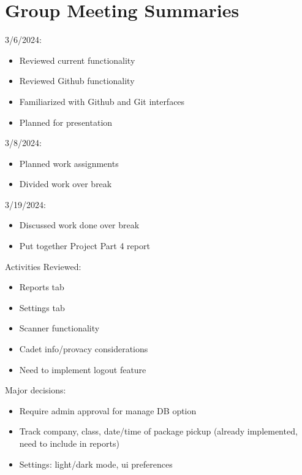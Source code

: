 \documentclass[11pt]{article}
\begin{document}
\section*{Group Meeting Summaries}
\label{sec:orge86276d}

3/6/2024:
\begin{itemize}
\item Reviewed current functionality
\item Reviewed Github functionality
\item Familiarized with Github and Git interfaces
\item Planned for presentation
\end{itemize}


3/8/2024:
\begin{itemize}
\item Planned work assignments
\item Divided work over break
\end{itemize}

3/19/2024:
\begin{itemize}
\item Discussed work done over break
\item Put together Project Part 4 report
\end{itemize}


Activities Reviewed:
\begin{itemize}
\item Reports tab
\item Settings tab
\item Scanner functionality
\item Cadet info/provacy considerations
\item Need to implement logout feature
\end{itemize}

Major decisions:
\begin{itemize}
\item Require admin approval for manage DB option
\item Track company, class, date/time of package pickup (already implemented, need to include in reports)
\item Settings: light/dark mode, ui preferences
\end{itemize}
\end{document}
